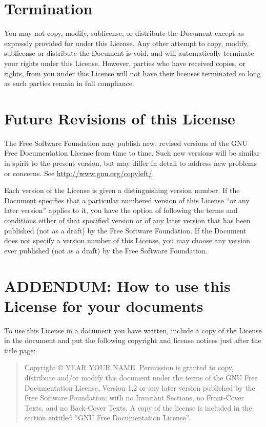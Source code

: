 \documentclass[12pt,a4paper,openany]{book}
\begin{document}
\section{Termination}
\label{FDL:sec9}

You may not copy, modify, sublicense, or distribute the Document except
as expressly provided for under this License.  Any other attempt to
copy, modify, sublicense or distribute the Document is void, and will
automatically terminate your rights under this License.  However,
parties who have received copies, or rights, from you under this
License will not have their licenses terminated so long as such
parties remain in full compliance.

\section{Future Revisions of this License}
\label{FDL:sec10}

The Free Software Foundation may publish new, revised versions
of the GNU Free Documentation License from time to time.  Such new
versions will be similar in spirit to the present version, but may
differ in detail to address new problems or concerns. See
\href{http://www.gnu.org/copyleft/}{http://www.gnu.org/copyleft/}.

Each version of the License is given a distinguishing version number.
If the Document specifies that a particular numbered version of this
License “or any later version” applies to it, you have the option of
following the terms and conditions either of that specified version or
of any later version that has been published (not as a draft) by the
Free Software Foundation.  If the Document does not specify a version
number of this License, you may choose any version ever published (not
as a draft) by the Free Software Foundation.

\section*{ADDENDUM: How to use this License for your documents}
{}

To use this License in a document you have written, include a copy of
the License in the document and put the following copyright and
license notices just after the title page:

\bigskip

\begin{quote}
Copyright © YEAR YOUR NAME.
Permission is granted to copy, distribute and/or modify this document
under the terms of the GNU Free Documentation License, Version 1.2
or any later version published by the Free Software Foundation;
with no Invariant Sections, no Front-Cover Texts, and no Back-Cover Texts.
A copy of the license is included in the section entitled “GNU
Free Documentation License”.
\end{quote}
\end{document}
